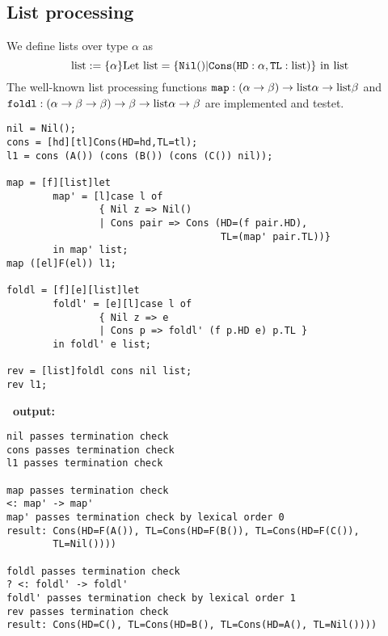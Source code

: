 \subsection{List processing\label{ex:list}}
We define lists over type $\alpha$ as
$$
    \mathrm{list} := \{\alpha\}\mathrm{Let}\  \mathrm{list} = \{
      \mathtt{Nil()} | \mathtt{Cons(HD}:\alpha \mathtt{, TL}:\mathrm{list}
      \mathtt{)} \} \ \mathrm{in}\ \mathrm{list}
$$
The well-known list processing functions $\mathtt{map} :  (\alpha
\rightarrow \beta) \rightarrow \mathrm{list} \alpha \rightarrow \mathrm{list} \beta$
and $\mathtt{foldl} : (\alpha \rightarrow \beta \rightarrow \beta)
\rightarrow \beta \rightarrow \mathrm{list} \alpha \rightarrow \beta$ are
implemented and testet.
\begin{verbatim}
nil = Nil();
cons = [hd][tl]Cons(HD=hd,TL=tl);
l1 = cons (A()) (cons (B()) (cons (C()) nil));

map = [f][list]let
        map' = [l]case l of
                { Nil z => Nil()
                | Cons pair => Cons (HD=(f pair.HD),
                                     TL=(map' pair.TL))}
        in map' list;
map ([el]F(el)) l1;

foldl = [f][e][list]let
        foldl' = [e][l]case l of
                { Nil z => e
                | Cons p => foldl' (f p.HD e) p.TL }
        in foldl' e list;

rev = [list]foldl cons nil list;
rev l1;
\end{verbatim}
{\bf\foetus\ output:}\nopagebreak
\begin{verbatim}
nil passes termination check
cons passes termination check
l1 passes termination check

map passes termination check
<: map' -> map'
map' passes termination check by lexical order 0
result: Cons(HD=F(A()), TL=Cons(HD=F(B()), TL=Cons(HD=F(C()),
        TL=Nil())))

foldl passes termination check
? <: foldl' -> foldl'
foldl' passes termination check by lexical order 1
rev passes termination check
result: Cons(HD=C(), TL=Cons(HD=B(), TL=Cons(HD=A(), TL=Nil())))
\end{verbatim}

